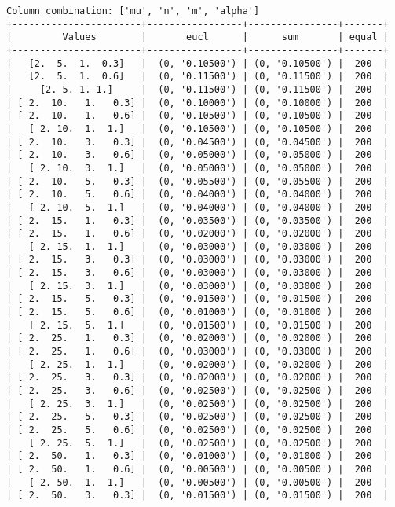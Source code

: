 \documentclass{article}
\begin{document}
\begin{verbatim}
Column combination: ['mu', 'n', 'm', 'alpha']
+-----------------------+-----------------+----------------+-------+
|         Values        |       eucl      |      sum       | equal |
+-----------------------+-----------------+----------------+-------+
|   [2.  5.  1.  0.3]   |  (0, '0.10500') | (0, '0.10500') |  200  |
|   [2.  5.  1.  0.6]   |  (0, '0.11500') | (0, '0.11500') |  200  |
|     [2. 5. 1. 1.]     |  (0, '0.11500') | (0, '0.11500') |  200  |
| [ 2.  10.   1.   0.3] |  (0, '0.10000') | (0, '0.10000') |  200  |
| [ 2.  10.   1.   0.6] |  (0, '0.10500') | (0, '0.10500') |  200  |
|   [ 2. 10.  1.  1.]   |  (0, '0.10500') | (0, '0.10500') |  200  |
| [ 2.  10.   3.   0.3] |  (0, '0.04500') | (0, '0.04500') |  200  |
| [ 2.  10.   3.   0.6] |  (0, '0.05000') | (0, '0.05000') |  200  |
|   [ 2. 10.  3.  1.]   |  (0, '0.05000') | (0, '0.05000') |  200  |
| [ 2.  10.   5.   0.3] |  (0, '0.05500') | (0, '0.05500') |  200  |
| [ 2.  10.   5.   0.6] |  (0, '0.04000') | (0, '0.04000') |  200  |
|   [ 2. 10.  5.  1.]   |  (0, '0.04000') | (0, '0.04000') |  200  |
| [ 2.  15.   1.   0.3] |  (0, '0.03500') | (0, '0.03500') |  200  |
| [ 2.  15.   1.   0.6] |  (0, '0.02000') | (0, '0.02000') |  200  |
|   [ 2. 15.  1.  1.]   |  (0, '0.03000') | (0, '0.03000') |  200  |
| [ 2.  15.   3.   0.3] |  (0, '0.03000') | (0, '0.03000') |  200  |
| [ 2.  15.   3.   0.6] |  (0, '0.03000') | (0, '0.03000') |  200  |
|   [ 2. 15.  3.  1.]   |  (0, '0.03000') | (0, '0.03000') |  200  |
| [ 2.  15.   5.   0.3] |  (0, '0.01500') | (0, '0.01500') |  200  |
| [ 2.  15.   5.   0.6] |  (0, '0.01000') | (0, '0.01000') |  200  |
|   [ 2. 15.  5.  1.]   |  (0, '0.01500') | (0, '0.01500') |  200  |
| [ 2.  25.   1.   0.3] |  (0, '0.02000') | (0, '0.02000') |  200  |
| [ 2.  25.   1.   0.6] |  (0, '0.03000') | (0, '0.03000') |  200  |
|   [ 2. 25.  1.  1.]   |  (0, '0.02000') | (0, '0.02000') |  200  |
| [ 2.  25.   3.   0.3] |  (0, '0.02000') | (0, '0.02000') |  200  |
| [ 2.  25.   3.   0.6] |  (0, '0.02500') | (0, '0.02500') |  200  |
|   [ 2. 25.  3.  1.]   |  (0, '0.02500') | (0, '0.02500') |  200  |
| [ 2.  25.   5.   0.3] |  (0, '0.02500') | (0, '0.02500') |  200  |
| [ 2.  25.   5.   0.6] |  (0, '0.02500') | (0, '0.02500') |  200  |
|   [ 2. 25.  5.  1.]   |  (0, '0.02500') | (0, '0.02500') |  200  |
| [ 2.  50.   1.   0.3] |  (0, '0.01000') | (0, '0.01000') |  200  |
| [ 2.  50.   1.   0.6] |  (0, '0.00500') | (0, '0.00500') |  200  |
|   [ 2. 50.  1.  1.]   |  (0, '0.00500') | (0, '0.00500') |  200  |
| [ 2.  50.   3.   0.3] |  (0, '0.01500') | (0, '0.01500') |  200  |

\end{verbatim}
\end{document}
